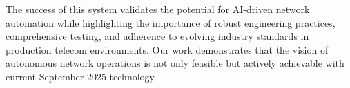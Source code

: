 The success of this system validates the potential for AI-driven network automation while highlighting the importance of robust engineering practices, comprehensive testing, and adherence to evolving industry standards in production telecom environments. Our work demonstrates that the vision of autonomous network operations is not only feasible but actively achievable with current September 2025 technology.